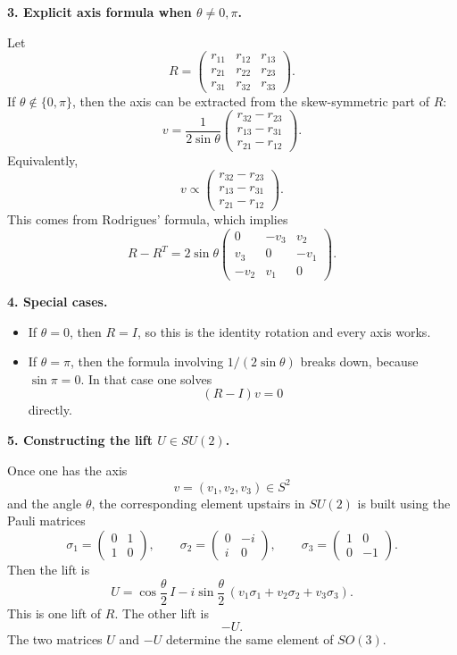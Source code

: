 \documentclass[12pt,a4paper]{article}
\theoremstyle{notespace}
\begin{document}
\medskip

\textbf{3. Explicit axis formula when \(\theta\neq 0,\pi\).}

Let
\[
R=
\begin{pmatrix}
	r_{11}&r_{12}&r_{13}\\
	r_{21}&r_{22}&r_{23}\\
	r_{31}&r_{32}&r_{33}
\end{pmatrix}.
\]
If \(\theta\notin\{0,\pi\}\), then the axis can be extracted from the skew-symmetric part of \(R\):
\[
\boxed{
	v=
	\frac{1}{2\sin\theta}
	\begin{pmatrix}
		r_{32}-r_{23}\\[4pt]
		r_{13}-r_{31}\\[4pt]
		r_{21}-r_{12}
	\end{pmatrix}.
}
\]
Equivalently,
\[
\boxed{
	v\propto
	\begin{pmatrix}
		r_{32}-r_{23}\\
		r_{13}-r_{31}\\
		r_{21}-r_{12}
	\end{pmatrix}.
}
\]
This comes from Rodrigues' formula, which implies
\[
R-R^T
=
2\sin\theta
\begin{pmatrix}
	0&-v_3&v_2\\
	v_3&0&-v_1\\
	-v_2&v_1&0
\end{pmatrix}.
\]

\medskip

\textbf{4. Special cases.}

\begin{itemize}
	\item If \(\theta=0\), then \(R=I\), so this is the identity rotation and every axis works.
	\item If \(\theta=\pi\), then the formula involving \(1/(2\sin\theta)\) breaks down, because \(\sin\pi=0\). In that case one solves
	\[
	(R-I)v=0
	\]
	directly.
\end{itemize}

\medskip

\textbf{5. Constructing the lift \(U\in SU(2)\).}

Once one has the axis
\[
v=(v_1,v_2,v_3)\in S^2
\]
and the angle \(\theta\), the corresponding element upstairs in \(SU(2)\) is built using the Pauli matrices
\[
\sigma_1=
\begin{pmatrix}
	0&1\\
	1&0
\end{pmatrix},
\qquad
\sigma_2=
\begin{pmatrix}
	0&-i\\
	i&0
\end{pmatrix},
\qquad
\sigma_3=
\begin{pmatrix}
	1&0\\
	0&-1
\end{pmatrix}.
\]
Then the lift is
\[
\boxed{
	U=
	\cos\frac{\theta}{2}\,I
	-
	i\sin\frac{\theta}{2}\,(v_1\sigma_1+v_2\sigma_2+v_3\sigma_3).
}
\]
This is one lift of \(R\). The other lift is
\[
\boxed{-U.}
\]
The two matrices \(U\) and \(-U\) determine the same element of \(SO(3)\).
\end{document}
